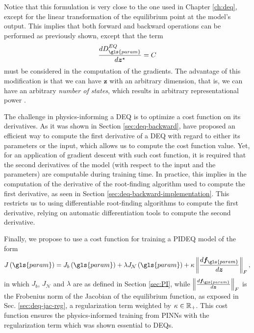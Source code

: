 Notice that this formulation is very close to the one used in Chapter \ref{ch:deq}, except for the linear transformation of the equilibrium point at the model's output.
This implies that both forward and backward operations can be performed as previously shown, except that the term  \[
    \frac{d D^{EQ}_{\gls{param}}}{d \bm{z}^{\star}} = C
\] must be considered in the computation of the gradients.
The advantage of this modification is that we can have $\bm{z}$ with an arbitrary dimension, that is, we can have an arbitrary \emph{number of states}, which results in arbitrary representational power \cite{Ghaoui2019}.

The challenge in physics-informing a \gls{DEQ} is to optimize a cost function on its derivatives.
As it was shown in Section \ref{sec:deq-backward}, \textcite{Bai2019} have proposed an efficient way to compute the first derivative of a \gls{DEQ} with regard to either its parameters or the input, which allows us to compute the cost function value.
Yet, for an application of gradient descent with such cost function, it is required that the second derivatives of the model (with respect to the input and the parameters) are computable during training time.
In practice, this implies in the computation of the derivative of the root-finding algorithm used to compute the first derivative, as seen in Section \ref{sec:deq-backward-implementation}.\footnotemark
{}
This restricts us to using differentiable root-finding algorithms to compute the first derivative, relying on automatic differentiation tools to compute the second derivative.

Finally, we propose to use a cost function for training a \gls{PIDEQ} model of the form \[
    J\left( \gls{param} \right) = J_b\left( \gls{param} \right) + \lambda J_{\mathcal{N}}\left( \gls{param} \right) + \kappa \left\lVert \frac{d \bm{f}_{\gls{param}}}{d \bm{z}}\right\rVert_F
,\] 
in which $J_b$, $J_{\mathcal{N}}$ and $\lambda$ are as defined in Section \ref{sec:PI}, while $\left\lVert \frac{d \bm{f}_{\gls{param}}}{d \bm{z}}\right\rVert_F$ is the Frobenius norm of the Jacobian of the equilibrium function, as exposed in Sec. \ref{sec:deq-jac-reg}, a regularization term weighted by $\kappa \in \mathbb{R}_+$.
This cost function ensures the physics-informed training from \gls{PINN}s with the regularization term which was shown essential to \gls{DEQ}s.

